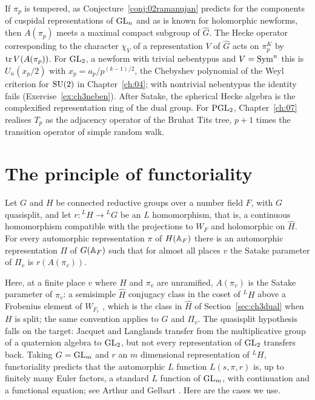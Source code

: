 If $\pi_p$ is tempered, as Conjecture~\ref{conj:02ramanujan} predicts for the components of cuspidal representations of $\mathrm{GL}_n$ and as is known for holomorphic newforms, then $A(\pi_p)$ meets a maximal compact subgroup of $\widehat G$. The Hecke operator corresponding to the character $\chi_V$ of a representation $V$ of $\widehat G$ acts on $\pi_p^K$ by $\operatorname{tr} V(A(\pi_p))$. For $\mathrm{GL}_2$, a newform with trivial nebentypus and $V=\operatorname{Sym}^n$ this is $U_n(x_p/2)$ with $x_p=a_p/p^{(k-1)/2}$, the Chebyshev polynomial of the Weyl criterion for $\mathrm{SU}(2)$ in Chapter~\ref{ch:04}; with nontrivial nebentypus the identity fails (Exercise~\ref{ex:ch3neben}). After Satake, the spherical Hecke algebra is the complexified representation ring of the dual group. For $\mathrm{PGL}_2$, Chapter~\ref{ch:07} realises $T_p$ as the adjacency operator of the Bruhat Tits tree, $p+1$ times the transition operator of simple random walk.

\section{The principle of functoriality}\label{sec:ch3funct}

\begin{conjecture}\label{conj:ch3funct}
Let $G$ and $H$ be connected reductive groups over a number field $F$, with $G$ quasisplit, and let $r:{}^LH\to{}^LG$ be an $L$ homomorphism, that is, a continuous homomorphism compatible with the projections to $W_F$ and holomorphic on $\widehat H$. For every automorphic representation $\pi$ of $H(\mathbb{A}_F)$ there is an automorphic representation $\Pi$ of $G(\mathbb{A}_F)$ such that for almost all places $v$ the Satake parameter of $\Pi_v$ is $r(A(\pi_v))$.
\end{conjecture}

Here, at a finite place $v$ where $H$ and $\pi_v$ are unramified, $A(\pi_v)$ is the Satake parameter of $\pi_v$: a semisimple $\widehat H$ conjugacy class in the coset of ${}^LH$ above a Frobenius element of $W_{F_v}$ \cite{borel1979}, which is the class in $\widehat H$ of Section~\ref{sec:ch3dual} when $H$ is split; the same convention applies to $G$ and $\Pi_v$. The quasisplit hypothesis falls on the target: Jacquet and Langlands transfer from the multiplicative group of a quaternion algebra to $\mathrm{GL}_2$, but not every representation of $\mathrm{GL}_2$ transfers back. Taking $G=\mathrm{GL}_m$ and $r$ an $m$ dimensional representation of ${}^LH$, functoriality predicts that the automorphic $L$ function $L(s,\pi,r)$ is, up to finitely many Euler factors, a standard $L$ function of $\mathrm{GL}_m$, with continuation and a functional equation; see Arthur \cite{arthur2003} and Gelbart \cite{gelbart1984}. Here are the cases we use.

